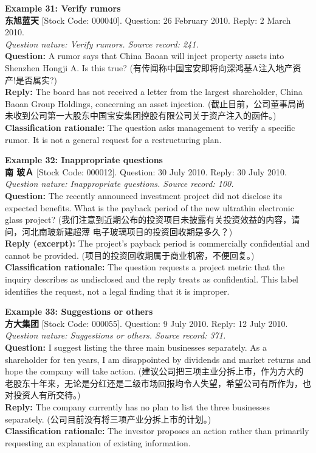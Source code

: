 \clearpage
\noindent \textbf{Example 31: Verify rumors} \\
\textbf{东旭蓝天} [Stock Code: 000040]. Question: 26 February 2010. Reply: 2 March 2010. \\
\textit{Question nature: Verify rumors. Source record: 241.} \\
\textbf{Question:} A rumor says that China Baoan will inject property assets into Shenzhen Hongji A. Is this true? (有传闻称中国宝安即将向深鸿基A注入地产资产!是否属实?) \\
\textbf{Reply:} The board has not received a letter from the largest shareholder, China Baoan Group Holdings, concerning an asset injection. (截止目前，公司董事局尚未收到公司第一大股东中国宝安集团控股有限公司关于资产注入的函件。) \\
\textbf{Classification rationale:} The question asks management to verify a specific rumor. It is not a general request for a restructuring plan.

\vspace{0.4cm}
\noindent \textbf{Example 32: Inappropriate questions} \\
\textbf{南 玻Ａ} [Stock Code: 000012]. Question: 30 July 2010. Reply: 30 July 2010. \\
\textit{Question nature: Inappropriate questions. Source record: 100.} \\
\textbf{Question:} The recently announced investment project did not disclose its expected benefits. What is the payback period of the new ultrathin electronic glass project? (我们注意到近期公布的投资项目未披露有关投资效益的内容，请问，河北南玻新建超薄 电子玻璃项目的投资回收期是多久？) \\
\textbf{Reply (excerpt):} The project's payback period is commercially confidential and cannot be provided. (项目的投资回收期属于商业机密，不便回复。) \\
\textbf{Classification rationale:} The question requests a project metric that the inquiry describes as undisclosed and the reply treats as confidential. This label identifies the request, not a legal finding that it is improper.

\clearpage
\noindent \textbf{Example 33: Suggestions or others} \\
\textbf{方大集团} [Stock Code: 000055]. Question: 9 July 2010. Reply: 12 July 2010. \\
\textit{Question nature: Suggestions or others. Source record: 371.} \\
\textbf{Question:} I suggest listing the three main businesses separately. As a shareholder for ten years, I am disappointed by dividends and market returns and hope the company will take action. (建议公司把三项主业分拆上市，作为方大的老股东十年来，无论是分红还是二级市场回报均令人失望，希望公司有所作为，也对投资人有所交待。) \\
\textbf{Reply:} The company currently has no plan to list the three businesses separately. (公司目前没有将三项产业分拆上市的计划。) \\
\textbf{Classification rationale:} The investor proposes an action rather than primarily requesting an explanation of existing information.

